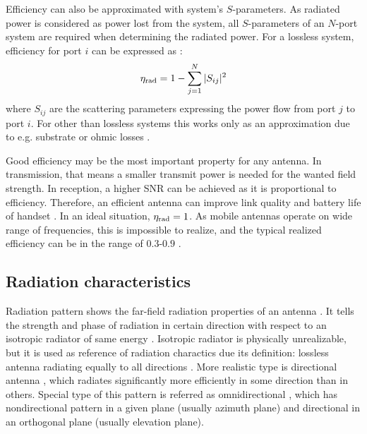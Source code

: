 Efficiency can also be approximated with system's $S$-parameters. As radiated power is considered as power lost from the system, all $S$-parameters of an $N$-port system are required when determining the radiated power. For a lossless system, efficiency for port $i$ can be expressed as \cite{lehtovuori_phd}:
\begin{equation}
\label{eq:eff_aprx}
    {\eta}_{\mathrm{rad}} = 1-\sum_{j=1}^{N}|S_{ij}|^2
\end{equation}
where $S_{ij}$ are the scattering parameters expressing the power flow from port $j$ to port $i$. For other than lossless systems this works only as an approximation due to e.g. substrate or ohmic losses \cite{lehtovuori_phd}.

Good efficiency may be the most important property for any antenna. In transmission, that means a smaller transmit power is needed for the wanted field strength. In reception, a higher SNR can be achieved as it is proportional to efficiency. Therefore, an efficient antenna can improve link quality and battery life of handset \cite{molisch}. In an ideal situation, ${\eta}_{\mathrm{rad}}=1$. As mobile antennas operate on wide range of frequencies, this is impossible to realize, and the typical realized efficiency can be in the range of $0.3$-$0.9$ \cite{volakis,ilvonen_phd}. %


\subsection{Radiation characteristics}
\label{sec:pattern}
Radiation pattern shows the far-field radiation properties of an antenna \cite{balanis, stutzman}. It tells the strength and phase of radiation in certain direction with respect to an isotropic radiator of same energy \cite{balanis}. Isotropic radiator is physically unrealizable, but it is used as reference of radiation charactics due its definition: lossless antenna radiating equally to all directions \cite{balanis}. More realistic type is directional antenna \cite{balanis}, which radiates significantly more efficiently in some direction than in others. Special type of this pattern is referred as omnidirectional \cite{balanis}, which has nondirectional pattern in a given plane (usually azimuth plane) and directional in an orthogonal plane (usually elevation plane).

